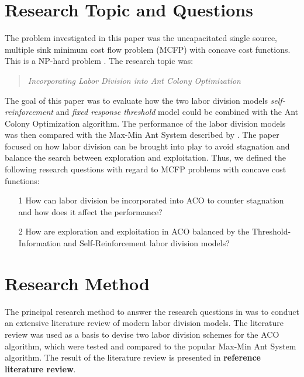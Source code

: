 

\section{Research Topic and Questions}\label{sec:research_topic_and_questions}
The problem investigated in this paper was the uncapacitated single source, multiple sink minimum cost flow problem (MCFP) with concave cost functions. This is a NP-hard problem \cite{Guisewite1990}. The research topic was:

\begin{quote}\itshape
Incorporating Labor Division into Ant Colony Optimization
\end{quote}

The goal of this paper was to evaluate how the two labor division models \emph{self-reinforcement} and \emph{fixed response threshold} model could be combined with the Ant Colony Optimization algorithm. The performance of the labor division models was then compared with the Max-Min Ant System described by \textcite{Stutzle1998}. The paper focused on how labor division can be brought into play to avoid stagnation and balance the search between exploration and exploitation. Thus, we defined the following research questions with regard to MCFP problems with concave cost functions:

\begin{itemize}
   \item[1] How can labor division be incorporated into ACO to counter stagnation and how does it affect the performance?
   \item[2] How are exploration and exploitation in ACO balanced by the Threshold-Information and Self-Reinforcement labor division models?
\end{itemize}



\section{Research Method}
The principal research method to answer the research questions in  was to conduct an extensive literature review of modern labor division models. The literature review was used as a basis to devise two labor division schemes for the ACO algorithm, which were tested and compared to the popular Max-Min Ant System algorithm. The result of the literature review is presented in \textbf{reference literature review}.

